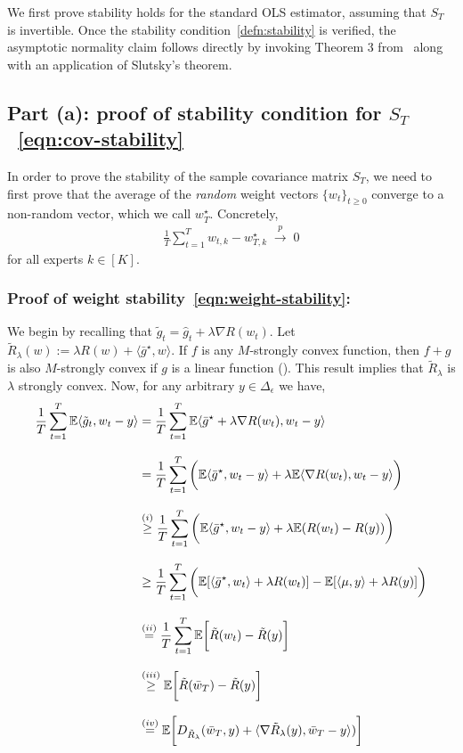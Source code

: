 \documentclass[11pt,letterpaper]{article}
\newcommand{\Exs}{\mathbb{E}}
\newcommand{\gtilde}{\widetilde{g}}
\newcommand{\ghat}{\widehat{g}}
\newcommand{\grad}{\nabla}
\newcommand{\wstar}{w^\star}
\newcommand{\inprob}{\; \stackrel{p}{\rightarrow} \; }
\theoremstyle{plain}
\theoremstyle{definition}  %
\begin{document}
\noindent We first prove stability holds for the standard OLS estimator, assuming that $S_T$ is invertible. Once the stability condition~\eqref{defn:stability} is verified, the asymptotic normality claim follows directly by invoking Theorem 3 from~\cite{lai1982least} along with an application of Slutsky's theorem. 

\subsection*{Part (a): proof of stability condition for $S_T$~\eqref{eqn:cov-stability}}

\noindent In order to prove the stability of the sample covariance matrix $S_T$, we need to first prove that the average of the \emph{random} weight vectors $\{w_{t}\}_{t \geq 0}$ converge to a non-random vector, which we call $w_T^\star$.  Concretely, 
\begin{align}
\label{eqn:weight-stability}
    \frac{1}{T}\sum_{t = 1}^T w_{t,k}-\wstar_{T,k}  \inprob 0
\end{align}
for all experts $k \in [K]$.  

\subsubsection*{Proof of weight stability~\eqref{eqn:weight-stability}:}

\noindent We begin by recalling that $\gtilde_t = \ghat_t + \lambda \grad R(w_t)$. Let $\tilde{R}_\lambda(w) := \lambda R(w) + \langle \bar g^\star, w\rangle $. If $f$ is any $M$-strongly convex function, then $f+g$ is also  $M$-strongly convex if $g$ is a linear function (\citet{nesterov2013introductory}). This result implies that $\tilde{R}_\lambda$ is $\lambda$ strongly convex. Now, for any arbitrary $y \in \Delta_\epsilon$ we have,
\begin{align} \label{eqn:master-ineqone}
\notag
  \dfrac{1}{T} \sum_{t=1}^T \Exs\langle \tilde{g}_t , w_{t} - y \rangle 
   & = \dfrac{1}{T} \sum_{t=1}^T \Exs\langle \bar g^\star + \lambda \nabla R(w_{t}) , w_{t} - y \rangle \\[8pt]\notag
   & = \dfrac{1}{T} \sum_{t=1}^T \bigg( \Exs\langle \bar g^\star, w_{t} - y \rangle  + \lambda \Exs \langle \nabla R(w_{t}) , w_{t} - y \rangle \bigg) \\[8pt]\notag
   & \overset{(i)}{\geq} \dfrac{1}{T} \sum_{t=1}^T \bigg( \Exs\langle \bar g^\star, w_{t} - y \rangle  + \lambda \Exs( R(w_{t}) - R(y)) \bigg) \\[8pt]\notag
   & \geq \dfrac{1}{T} \sum_{t=1}^T \bigg( \Exs [\langle \bar g^\star, w_{t} \rangle +  \lambda R(w_{t})]  -\Exs [\langle \mu, y \rangle +  \lambda R(y)] \bigg) \\[8pt]\notag
   & \overset{(ii)}{=}  \dfrac{1}{T} \sum_{t=1}^T \Exs \bigg[\tilde{R}(w_{t})  - \tilde{R}(y) \bigg] \\[8pt]\notag
   & \overset{(iii)}{\geq}  \Exs \bigg[\tilde{R}(\bar{w}_{T})  - \tilde{R}(y) \bigg]\\[8pt]
   & \overset{(iv)}{=}  \Exs \bigg[D_{\tilde{R}_\lambda}(\bar{w}_{T},y) + \langle \nabla \tilde{R}_\lambda(y), \bar{w}_{T}-y\rangle) \bigg]
\end{align}
\end{document}
